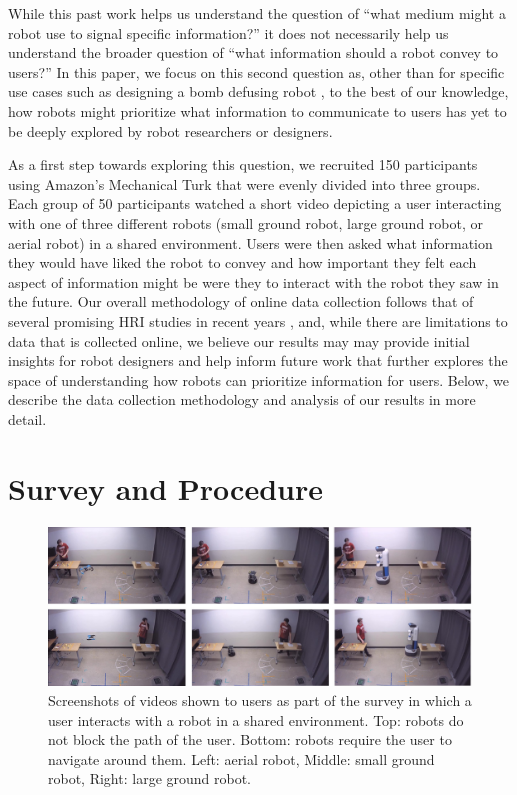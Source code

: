 \documentclass[letterpaper, 10 pt, conference]{ieeeconf}  %
\begin{document}
While this past work helps us understand the question of ``what medium might a robot use to signal specific information?'' it does not necessarily help us understand the broader question of ``what information should a robot convey to users?'' In this paper, we focus on this second question as, other than for specific use cases such as designing a bomb defusing robot \cite{adams2005human}, to the best of our knowledge, how robots might prioritize what information to communicate to users has yet to be deeply explored by robot researchers or designers.

As a first step towards exploring this question, we recruited 150 participants using Amazon's Mechanical Turk that were evenly divided into three groups. Each group of 50 participants watched a short video depicting a user interacting with one of three different robots (small ground robot, large ground robot, or aerial robot) in a shared environment. Users were then asked what information they would have liked the robot to convey and how important they felt each aspect of information might be were they to interact with the robot they saw in the future. Our overall methodology of online data collection follows that of several promising HRI studies in recent years \cite{Song:2018,hoffman2019,Zhou:2017}, and, while there are limitations to data that is collected online, we believe our results may may provide initial insights for robot designers and help inform future work that further explores the space of understanding how robots can prioritize information for users. %
Below, we describe the data collection methodology and analysis of our results in more detail.

\section{Survey and Procedure} \label{survey}

\begin{figure}
\centering
\includegraphics[width=\textwidth]{figures/task3robots.jpg}
\caption{Screenshots of videos shown to users as part of the survey in which a user interacts with a robot in a shared environment. Top: robots do not block the path of the user. Bottom: robots require the user to navigate around them. Left: aerial robot, Middle: small ground robot, Right: large ground robot.}
\label{fig:task}
\end{figure}
\end{document}
